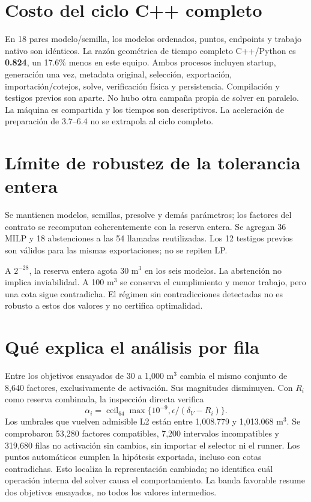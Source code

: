 \documentclass[11pt]{article}
\begin{document}
\section*{Costo del ciclo C++ completo}
En 18 pares modelo/semilla, los modelos ordenados, puntos, endpoints y trabajo
nativo son idénticos. La razón geométrica de tiempo completo C++/Python es
\textbf{0.824}, un 17.6\% menos en este equipo. Ambos procesos incluyen startup,
generación una vez, metadata original, selección, exportación, importación/cotejos,
solve, verificación física y persistencia. Compilación y testigos previos son aparte.
No hubo otra campaña propia de solver en paralelo. La máquina es compartida y
los tiempos son descriptivos. La aceleración de preparación de 3.7--6.4 no se
extrapola al ciclo completo.

\begin{center}\small

\end{center}

\section*{Límite de robustez de la tolerancia entera}
Se mantienen modelos, semillas, presolve y demás parámetros; los factores del
contrato se recomputan coherentemente con la reserva entera. Se agregan 36 MILP y
18 abstenciones a las 54 llamadas reutilizadas. Los 12 testigos previos son
válidos para las mismas exportaciones; no se repiten LP.

\begin{center}\small
\resizebox{\linewidth}{!}{}
\end{center}

A $2^{-28}$, la reserva entera agota 30 m$^3$ en los seis modelos. La abstención
no implica inviabilidad. A 100 m$^3$ se conserva el cumplimiento y menor trabajo,
pero una cota sigue contradicha. El régimen sin contradicciones detectadas no es
robusto a estos dos valores y no certifica optimalidad.

\section*{Qué explica el análisis por fila}
Entre los objetivos ensayados de 30 a 1,000 m$^3$ cambia el mismo conjunto de
8,640 factores, exclusivamente de activación. Sus magnitudes disminuyen.
Con $R_i$ como reserva combinada, la inspección directa verifica
\[
\alpha_i=\operatorname{ceil}_{64}\max\{10^{-9},\epsilon/(\delta_V-R_i)\}.
\]
Los umbrales que vuelven admisible L2 están entre 1,008.779 y 1,013.068 m$^3$.
Se comprobaron 53,280 factores compatibles, 7,200 intervalos incompatibles y
319,680 filas no activación sin cambios, sin importar el selector ni el runner.
Los puntos automáticos cumplen la hipótesis exportada, incluso con cotas
contradichas. Esto localiza la representación cambiada; no identifica cuál
operación interna del solver causa el comportamiento. La banda favorable resume
dos objetivos ensayados, no todos los valores intermedios.
\end{document}
